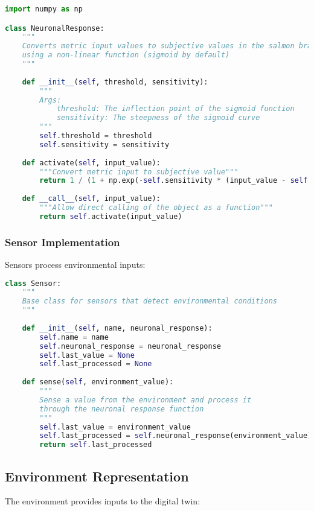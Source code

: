 \documentclass[11pt,a4paper]{article}
\begin{document}
\begin{lstlisting}[language=Python]
import numpy as np

class NeuronalResponse:
    """
    Converts metric input values to subjective values in the salmon brain
    using a non-linear function (sigmoid by default)
    """
    
    def __init__(self, threshold, sensitivity):
        """
        Args:
            threshold: The inflection point of the sigmoid function
            sensitivity: The steepness of the sigmoid curve
        """
        self.threshold = threshold
        self.sensitivity = sensitivity
    
    def activate(self, input_value):
        """Convert metric input to subjective value"""
        return 1 / (1 + np.exp(-self.sensitivity * (input_value - self.threshold)))
        
    def __call__(self, input_value):
        """Allow direct calling of the object as a function"""
        return self.activate(input_value)
\end{lstlisting}

\subsubsection{Sensor Implementation}
Sensors process environmental inputs:

\begin{lstlisting}[language=Python]
class Sensor:
    """
    Base class for sensors that detect environmental conditions
    """
    
    def __init__(self, name, neuronal_response):
        self.name = name
        self.neuronal_response = neuronal_response
        self.last_value = None
        self.last_processed = None
        
    def sense(self, environment_value):
        """
        Sense a value from the environment and process it
        through the neuronal response function
        """
        self.last_value = environment_value
        self.last_processed = self.neuronal_response(environment_value)
        return self.last_processed
\end{lstlisting}

\subsection{Environment Representation}
The environment provides inputs to the digital twin:
\end{document}
